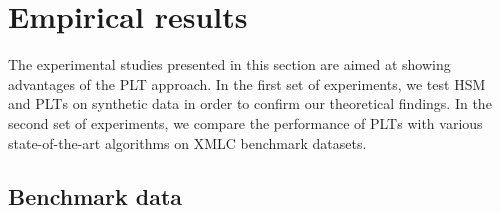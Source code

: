 \documentclass{article}
\newcommand{\Algo}[1]{\textsc{#1}}
\newcommand{\sectionBefore}{-0pt}
\newcommand{\sectionAfter}{-0pt}
\begin{document}



\vspace{\sectionBefore}
\section{Empirical results}
\label{sec:empirical_results}
\vspace{\sectionAfter}

The experimental studies presented in this section are aimed at showing advantages of the \Algo{PLT} approach. In the first set of experiments, we test \Algo{HSM} and \Algo{PLT}s on synthetic data in order to confirm our theoretical findings. In the second set of experiments, we compare the performance of \Algo{PLT}s with various state-of-the-art algorithms on XMLC benchmark datasets.


\subsection{Benchmark data}
\end{document}
